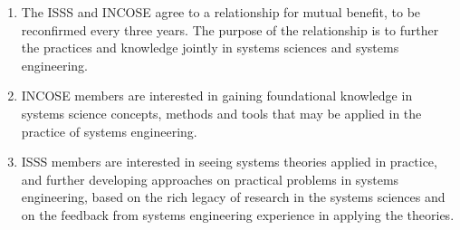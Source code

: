 \begin{enumerate}
	\item The ISSS and INCOSE agree to a relationship for mutual benefit, to be reconfirmed every three years. The purpose of the relationship is to further the practices and knowledge jointly in systems sciences and systems engineering.
	\item INCOSE members are interested in gaining foundational knowledge in systems science concepts, methods and tools that may be applied in the practice of systems engineering.
	\item ISSS members are interested in seeing systems theories applied in practice, and further developing approaches on practical problems in systems engineering, based on the rich legacy of research in the systems sciences and on the feedback from systems engineering experience in applying the theories.
\end{enumerate}

